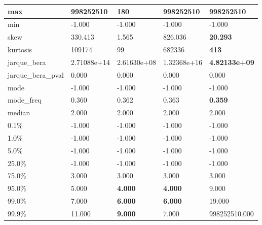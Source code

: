 \begin{table}[H]
\begin{tabular}{|l|m{10em}|m{10em}|m{10em}|m{10em}|}
\hline max & 998252510 & \cellcolor[rgb]{0.9, 0.54, 0.52} 180 & \bfseries 998252510 & \bfseries 998252510 \\
\hline min & -1.000 & -1.000 & -1.000 & -1.000 \\
\hline skew & 330.413 & 1.565 & \cellcolor[rgb]{0.9, 0.54, 0.52} 826.036 & \bfseries 20.293 \\
\hline kurtosis & 109174 & 99 & \cellcolor[rgb]{0.9, 0.54, 0.52} 682336 & \bfseries 413 \\
\hline jarque\_bera & 2.71088e+14 & 2.61630e+08 & \cellcolor[rgb]{0.9, 0.54, 0.52} 1.32368e+16 & \bfseries 4.82133e+09 \\
\hline jarque\_bera\_pval & 0.000 & 0.000 & 0.000 & 0.000 \\
\hline mode & -1.000 & -1.000 & -1.000 & -1.000 \\
\hline mode\_freq & 0.360 & 0.362 & \cellcolor[rgb]{0.9, 0.54, 0.52} 0.363 & \bfseries 0.359 \\
\hline median & 2.000 & 2.000 & 2.000 & 2.000 \\
\hline 0.1\% & -1.000 & -1.000 & -1.000 & -1.000 \\
\hline 1.0\% & -1.000 & -1.000 & -1.000 & -1.000 \\
\hline 5.0\% & -1.000 & -1.000 & -1.000 & -1.000 \\
\hline 25.0\% & -1.000 & -1.000 & -1.000 & -1.000 \\
\hline 75.0\% & 3.000 & 3.000 & 3.000 & 3.000 \\
\hline 95.0\% & 5.000 & \bfseries 4.000 & \bfseries 4.000 & \cellcolor[rgb]{0.9, 0.54, 0.52} 9.000 \\
\hline 99.0\% & 7.000 & \bfseries 6.000 & \bfseries 6.000 & \cellcolor[rgb]{0.9, 0.54, 0.52} 19.000 \\
\hline 99.9\% & 11.000 & \bfseries 9.000 & 7.000 & \cellcolor[rgb]{0.9, 0.54, 0.52} 998252510.000 \\
\hline
\end{tabular}
\end{table}

